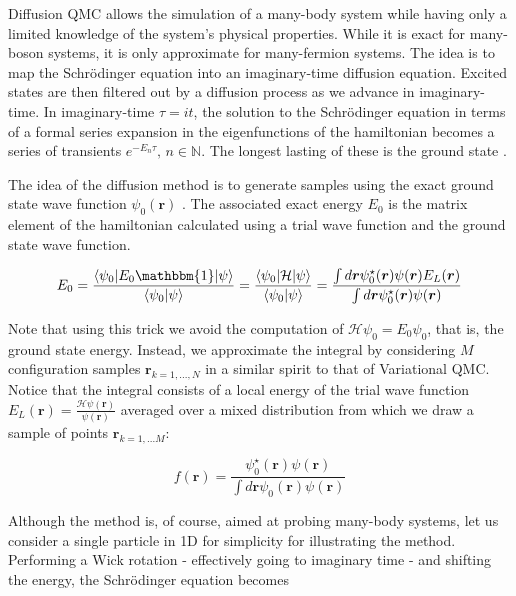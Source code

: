 Diffusion \ac{QMC} allows the simulation of a many-body system while having only a limited knowledge of the system's physical properties.
While it is exact for many-boson systems, it is only approximate for many-fermion systems.
The idea is to map the Schr\"odinger equation into  an imaginary-time diffusion equation.
Excited states are then filtered out by a diffusion process as we advance in imaginary-time.
In imaginary-time $\tau = i t$, the solution to the Schr\"odinger equation in terms of a formal series expansion in the eigenfunctions of the hamiltonian becomes a series of transients $e^{-E_n \tau}, \, n \in \mathbb{N}$.
The longest lasting of these is the ground state  \cite{kosztin_introduction_1996}.

The idea of the diffusion method is to generate samples using the exact ground state wave function $\psi_0 (\bm r)$ \cite{toulouse_chapter_2016}.
The associated exact energy $E_0$ is the matrix element of the hamiltonian calculated using a trial wave function and the ground state wave function.

\begin{equation}
E_0 = \frac{ \left\langle \psi_0 |E_0 \mathbbm{1} | \psi \right\rangle}{\left\langle \psi_0 | \psi \right\rangle} = \frac{\left\langle \psi_0 | \mathcal{H} | \psi \right\rangle}{ \left\langle\psi_0 | \psi \right\rangle} = \frac{\int d\bm r \psi_0^\star (\bm r) \psi (\bm r) E_L (\bm r)}{\int d\bm r\psi_0^\star (\bm r) \psi (\bm r)}
\end{equation}

Note that using this trick we avoid the computation of $\mathcal{H} \psi_0 = E_0 \psi_0$, that is, the ground state energy.
Instead, we approximate the integral by considering $M$ configuration samples $\bm r_{k = 1,..., N}$ in a similar spirit to that of Variational \ac{QMC}.
Notice that the integral consists of a local energy of the trial wave function $E_L (\bm r) = \frac{\mathcal{H} \psi (\bm r)}{\psi (\bm r)}$ averaged over a mixed distribution from which we draw a sample of points $\bm r_{k=1,...M}$:

\begin{equation}
f(\bm r) = \frac{\psi_0^\star (\bm r) \psi (\bm r) }{ \int d\bm r  \psi_0 (\bm r) \psi (\bm r)}
\end{equation}

Although the method is, of course, aimed at probing many-body systems, let us consider a single particle in \acs{1D} for simplicity for illustrating the method.
Performing a Wick rotation - effectively going to imaginary time - and shifting the energy, the Schr\"odinger equation becomes

